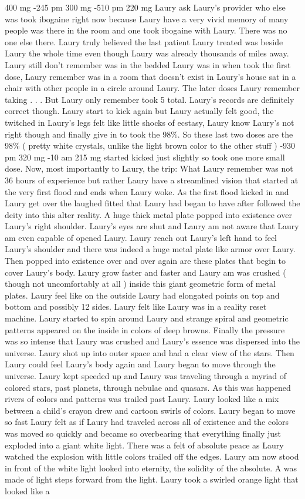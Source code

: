 \documentclass[12pt]{book}
\begin{document}
400 mg -245 pm 300 mg -510 pm 220 mg Laury ask Laury's provider who else was took ibogaine right now because Laury have a very vivid memory of many people was there in the room and one took ibogaine with Laury. There was no one else there. Laury truly believed the last patient Laury treated was beside Laury the whole time even though Laury was already thousands of miles away. Laury still don't remember was in the bedded Laury was in when took the first dose, Laury remember was in a room that doesn't exist in Laury's house sat in a chair with other people in a circle around Laury. The later doses Laury remember taking . . .  But Laury only remember took 5 total. Laury's records are definitely correct though. Laury start to kick again but Laury actually felt good, the twitched in Laury's legs felt like little shocks of ecstasy, Laury know Laury's not right though and finally give in to took the 98\%. So these last two doses are the 98\% ( pretty white crystals, unlike the light brown color to the other stuff ) -930 pm 320 mg -10 am 215 mg started kicked just slightly so took one more small dose. Now, most importantly to Laury, the trip: What Laury remember was not 36 hours of experience but rather Laury have a streamlined vision that started at the very first flood and ends when Laury woke. As the first flood kicked in and Laury get over the laughed fitted that Laury had began to have after followed the deity into this alter reality. A huge thick metal plate popped into existence over Laury's right shoulder. Laury's eyes are shut and Laury am not aware that Laury am even capable of opened Laury. Laury reach out Laury's left hand to feel Laury's shoulder and there was indeed a huge metal plate like armor over Laury. Then popped into existence over and over again are these plates that begin to cover Laury's body. Laury grow faster and faster and Laury am was crushed ( though not uncomfortably at all ) inside this giant geometric form of metal plates. Laury feel like on the outside Laury had elongated points on top and bottom and possibly 12 sides. Laury felt like Laury was in a reality reset machine. Laury started to spin around Laury and strange spiral and geometric patterns appeared on the inside in colors of deep browns. Finally the pressure was so intense that Laury was crushed and Laury's essence was dispersed into the universe. Laury shot up into outer space and had a clear view of the stars. Then Laury could feel Laury's body again and Laury began to move through the universe. Laury kept speeded up and Laury was traveling through a myriad of colored stars, past planets, through nebulae and quasars. As this was happened rivers of colors and patterns was trailed past Laury. Laury looked like a mix between a child's crayon drew and cartoon swirls of colors. Laury began to move so fast Laury felt as if Laury had traveled across all of existence and the colors was moved so quickly and became so overbearing that everything finally just exploded into a giant white light. There was a felt of absolute peace as Laury watched the explosion with little colors trailed off the edges. Laury am now stood in front of the white light looked into eternity, the solidity of the absolute. A was made of light steps forward from the light. Laury took a swirled orange light that looked like a 
\end{document}
